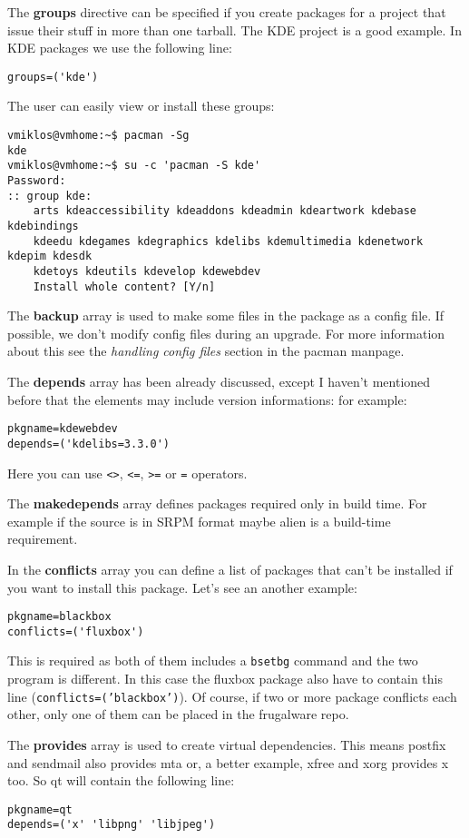 The \textbf{groups} directive can be specified if you create packages for a project that issue their stuff in more than one tarball. The KDE project is a good example. In KDE packages we use the following line:
\begin{verbatim}
groups=('kde')
\end{verbatim}

The user can easily view or install these groups:
\begin{verbatim}
vmiklos@vmhome:~$ pacman -Sg
kde
vmiklos@vmhome:~$ su -c 'pacman -S kde'
Password:
:: group kde:
    arts kdeaccessibility kdeaddons kdeadmin kdeartwork kdebase kdebindings
    kdeedu kdegames kdegraphics kdelibs kdemultimedia kdenetwork kdepim kdesdk
    kdetoys kdeutils kdevelop kdewebdev
    Install whole content? [Y/n]
\end{verbatim}

The \textbf{backup} array is used to make some files in the package as a config file. If possible, we don't modify config files during an upgrade. For more information about this see the \textit{handling config files} section in the pacman manpage.

The \textbf{depends} array has been already discussed, except I haven't mentioned before that the elements may include version informations: for example:
\begin{verbatim}
pkgname=kdewebdev
depends=('kdelibs=3.3.0')
\end{verbatim}

Here you can use {\tt <>}, {\tt <=}, {\tt >=} or {\tt =} operators.

The \textbf{makedepends} array defines packages required only in build time. For example if the source is in SRPM format maybe alien is a build-time requirement.

In the \textbf{conflicts} array you can define a list of packages that can't be installed if you want to install this package. Let's see an another example:

\begin{verbatim}
pkgname=blackbox
conflicts=('fluxbox')
\end{verbatim}

This is required as both of them includes a {\tt bsetbg} command and the two program is different. In this case the fluxbox package also have to contain this line ({\tt conflicts=('blackbox')}). Of course, if two or more package conflicts each other, only one of them can be placed in the frugalware repo. 

The \textbf{provides} array is used to create virtual dependencies. This means postfix and sendmail also provides mta or, a better example, xfree and xorg provides x too. So qt will contain the following line:
\begin{verbatim}
pkgname=qt
depends=('x' 'libpng' 'libjpeg')
\end{verbatim}

